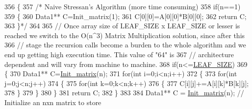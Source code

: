 \begin{DoxyCode}
356                         \{   
357                                 \textcolor{comment}{/* Naive Stressan's Algorithm (more time consuming)}
358 \textcolor{comment}{                                  if(n==1)}
359 \textcolor{comment}{                                \{}
360 \textcolor{comment}{                                        Data1** C=Init\_matrix(1);}
361 \textcolor{comment}{                                        C[0][0]=A[0][0]*B[0][0];}
362 \textcolor{comment}{                                        return C;}
363 \textcolor{comment}{                                \}*/}
364 
365                                 \textcolor{comment}{// Once array size of LEAF\_SIZE x LEAF\_SIZE or lesser is reached we switch
       to the O(n^3) Matrix Multiplication solution, since after this }
366                                 \textcolor{comment}{// stage the recursion calls become a burden to the whole algorithm and we
       end up getting high execution time. This value of "64" is }
367                                 \textcolor{comment}{// architecture dependent and will vary from machine to machine.}
368                                 \textcolor{keywordflow}{if}(n<=\hyperlink{classMATOPS_1_1BigMatrix_a3e8820058e3950e17136fd656b97de54}{LEAF\_SIZE})
369                                 \{
370                                         Data1** C=\hyperlink{classMATOPS_1_1BigMatrix_a2730be4ce100cfdbaf1240703bd9cfb9}{Init\_matrix}(n);
371                                         \textcolor{keywordflow}{for}(\textcolor{keywordtype}{int} i=0;i<n;i++)
372                                         \{
373                                                 \textcolor{keywordflow}{for}(\textcolor{keywordtype}{int} j=0;j<n;j++)
374                                                 \{
375                                                         \textcolor{keywordflow}{for}(\textcolor{keywordtype}{int} k=0;k<n;k++)
376                                                         \{
377                                                                 C[i][j]+=A[i][k]*B[k][j];
378                                                         \}
379                                                 \}
380                                         \}
381                                         \textcolor{keywordflow}{return} C;
382                                 \}
383 
384                                 Data1** C = \hyperlink{classMATOPS_1_1BigMatrix_a2730be4ce100cfdbaf1240703bd9cfb9}{Init\_matrix}(n); \textcolor{comment}{// Initialize an nxn matrix to store
}
\end{DoxyCode}
